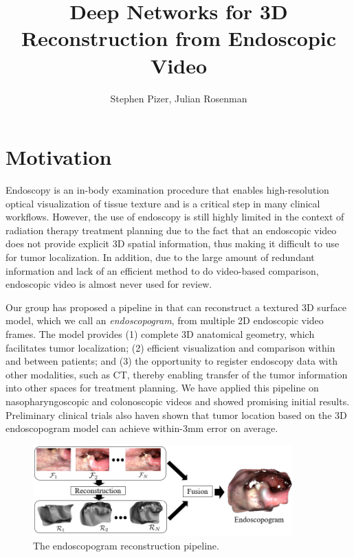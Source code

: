 \documentclass{llncs}
\begin{document}
\title{Deep Networks for 3D Reconstruction from Endoscopic Video}

\author{Stephen Pizer, Julian Rosenman}
\maketitle

\section{Motivation}
Endoscopy is an in-body examination procedure that enables high-resolution optical visualization of tissue texture and is a critical step in many clinical workflows. However, the use of endoscopy is still highly limited in the context of radiation therapy treatment planning due to the fact that an endoscopic video does not provide explicit 3D spatial information, thus making it difficult to use for tumor localization. In addition, due to the large amount of redundant information and lack of an efficient method to do video-based comparison, endoscopic video is almost never used for review.

Our group has proposed a pipeline in \cite{zhao16} that can reconstruct a textured 3D surface model, which we call an \textit{endoscopogram}, from multiple 2D endoscopic video frames. The model provides (1) complete 3D anatomical geometry, which facilitates tumor localization; (2) efficient visualization and comparison within and between patients; and (3) the opportunity to register endoscopy data with other modalities, such as CT, thereby enabling transfer of the tumor information into other spaces for treatment planning. We have applied this pipeline on nasopharyngoscopic and colonoscopic videos \cite{zhao16,rui16} and showed promising initial results. Preliminary clinical trials also haven shown that tumor location based on the 3D endoscopogram model can achieve within-3mm error on average.

\begin{figure}[!b]
  \centering
  \includegraphics[height=3.5cm]{figures/pipeline}
  \caption{The endoscopogram reconstruction pipeline.}
\end{figure}
\end{document}
